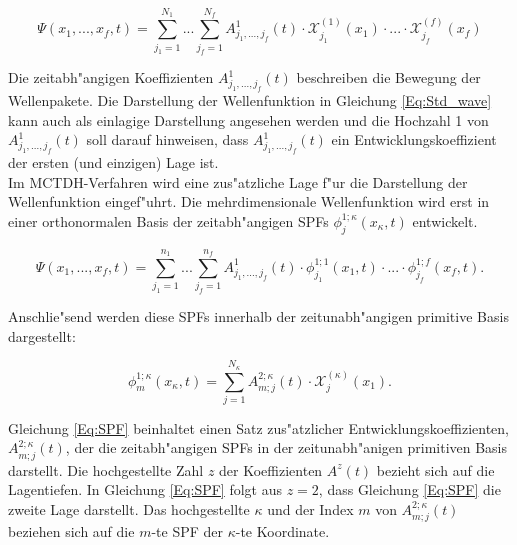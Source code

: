  \begin{equation}
 \Psi(x_{1},..., x_{f}, t)=\sum^{N_{1}}_{j_{1}=1} ... \sum^{N_{f}}_{j_{f}=1} A^{1}_{j_{1}, ..., j_{f}}(t)\cdot \mathcal{X}^{(1)}_{j_{1}}(x_{1}) \cdot ... \cdot \mathcal{X}^{(f)}_{j_{f}}(x_{f})
 \label{Eq:Std_wave}
 \end{equation}

Die zeitabh"angigen Koeffizienten $A^{1}_{j_{1}, ..., j_{f}}(t)$ beschreiben die Bewegung der Wellenpakete.
Die Darstellung der Wellenfunktion in Gleichung  \ref{Eq:Std_wave} kann auch als einlagige Darstellung angesehen werden
und die Hochzahl 1 von $A^{1}_{j_{1}, ..., j_{f}}(t)$ soll darauf hinweisen, dass $A^{1}_{j_{1}, ..., j_{f}}(t)$ ein Entwicklungskoeffizient
der ersten (und einzigen) Lage ist.
\\Im MCTDH-Verfahren wird eine zus"atzliche Lage f"ur die Darstellung der Wellenfunktion eingef"uhrt.
Die mehrdimensionale Wellenfunktion wird erst in einer orthonormalen Basis der zeitabh"angigen SPFs $\phi^{1;\kappa}_{j}(x_{\kappa},t)$
entwickelt.


 \begin{equation}
 \Psi(x_{1},..., x_{f}, t)=\sum^{n_{1}}_{j_{1}=1} ... \sum^{n_{f}}_{j_{f}=1} A^{1}_{j_{1}, ..., j_{f}}(t)
 \cdot \phi^{1;1}_{j_{1}}(x_{1}, t) \cdot ... \cdot \phi^{1;f}_{j_{f}}(x_{f}, t).
 \label{Eq:mctdh_wave}
 \end{equation}

Anschlie"send werden diese SPFs innerhalb der zeitunabh"angigen primitive Basis darge\-stellt: 

\begin{equation}
 \phi^{1;\kappa}_{m} (x_{\kappa}, t)=\sum^{N_{\kappa}}_{j=1} A^{2;\kappa}_{m;j}(t) \cdot \mathcal{X}^{(\kappa)}_{j}(x_{1}).
 \label{Eq:SPF}
 \end{equation}

Gleichung \ref{Eq:SPF} beinhaltet einen Satz zus"atzlicher Entwicklungskoeffizienten, $ A^{2;\kappa}_{m;j}(t) $, der die zeitabh"angigen SPFs
in der zeitunabh"anigen primitiven Basis darstellt.
Die hochgestellte Zahl $z$ der Koeffizienten $A^{z}(t)$ bezieht sich auf die Lagentiefen.
In Glei\-chung \ref{Eq:SPF} folgt aus $z=2$, dass Gleichung \ref{Eq:SPF} die zweite Lage darstellt.
Das hochgestellte $\kappa$ und der Index $m$ von $A^{2;\kappa}_{m;j}(t)$ beziehen sich auf die $m$-te SPF der $\kappa$-te Koordinate.

